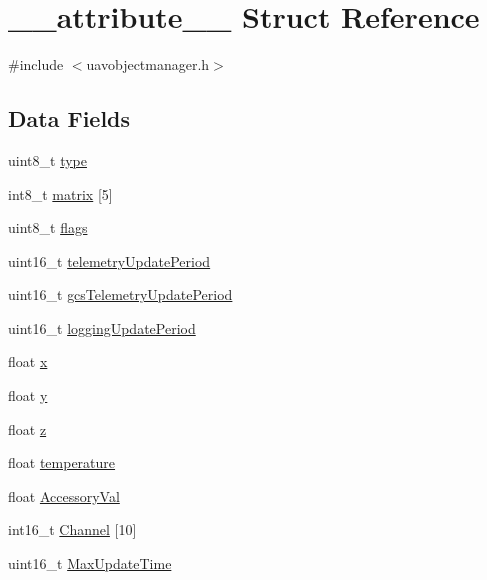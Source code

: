 \hypertarget{struct____attribute____}{\section{\-\_\-\-\_\-attribute\-\_\-\-\_\- \-Struct \-Reference}
\label{struct____attribute____}
}


{\ttfamily \#include $<$uavobjectmanager.\-h$>$}

\subsection*{\-Data \-Fields}
\begin{DoxyCompactItemize}
\item 
uint8\-\_\-t \hyperlink{struct____attribute_____a30e60959661cf2e3b2dcc52e5d3e9249}{type}
\item 
int8\-\_\-t \hyperlink{struct____attribute_____a443b6e5347cb65e8a297b596be99e467}{matrix} \mbox{[}5\mbox{]}
\item 
uint8\-\_\-t \hyperlink{struct____attribute_____a2c5106312c60da8340d95ea8f201e8f2}{flags}
\item 
uint16\-\_\-t \hyperlink{struct____attribute_____a07d69a32a8cbb34c8dc822e7bf30f73e}{telemetry\-Update\-Period}
\item 
uint16\-\_\-t \hyperlink{struct____attribute_____a6725d1b44961129705dbb1f209ba7b8d}{gcs\-Telemetry\-Update\-Period}
\item 
uint16\-\_\-t \hyperlink{struct____attribute_____a85a81b55d67790a728b95eee989f17ed}{logging\-Update\-Period}
\item 
float \hyperlink{struct____attribute_____a65823868c215c44bb8a17253d81372f8}{x}
\item 
float \hyperlink{struct____attribute_____afe44c79e22a712d1364d3d7cd86150eb}{y}
\item 
float \hyperlink{struct____attribute_____a6f35aeb7dca68894b6f64cdad1a4bdd2}{z}
\item 
float \hyperlink{struct____attribute_____ad8ae98d5256d8f133d5e71db56f72cfe}{temperature}
\item 
float \hyperlink{struct____attribute_____a025c06116a6a060e68a74c6b5d6259f5}{\-Accessory\-Val}
\item 
int16\-\_\-t \hyperlink{struct____attribute_____abe7c51e2ae00d9c0abed1d8f8f3aa2ed}{\-Channel} \mbox{[}10\mbox{]}
\item 
uint16\-\_\-t \hyperlink{struct____attribute_____af148713957f57f356135e3bae826c4b2}{\-Max\-Update\-Time}

\end{DoxyCompactItemize}
